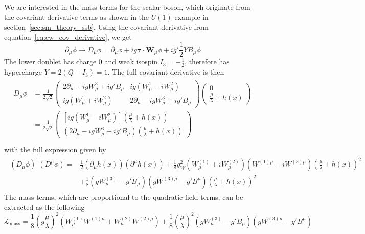 We are interested in the mass terms for the scalar boson, which originate from the covariant derivative terms as shown in the $U(1)$ example in section~\ref{sec:sm_theory_ssb}. Using the covariant derivative from equation~\ref{eq:ew_cov_derivative}, we get
\begin{equation}
	\partial_\mu\phi\to D_\mu\phi=\partial_\mu\phi+ig\boldsymbol{\tau}\cdot\mathbf{W}_\mu\phi+ig'\frac{1}{2}YB_\mu\phi
\end{equation}
The lower doublet has charge 0 and weak isospin $I_3=-\frac{1}{2}$, therefore has hypercharge $Y=2(Q-I_3)=1$. The full covariant derivative is then
\begin{align}
	\begin{split}
		D_\mu\phi&=\frac{1}{2\sqrt{2}}\begin{pmatrix}2\partial_\mu+igW_\mu^3+ig'B_\mu&ig(W_\mu^1-iW_\mu^2)\\ig(W_\mu^1+iW_\mu^2)&2\partial_\mu-igW_\mu^3+ig'B_\mu\end{pmatrix}\begin{pmatrix}0\\\frac{\mu}{\lambda}+h(x)\end{pmatrix}\\
		&=\frac{1}{2\sqrt{2}}\begin{pmatrix}\left[ig(W_\mu^1-iW_\mu^2)\right]\left(\frac{\mu}{\lambda}+h(x)\right)\\\left(2\partial_\mu-igW_\mu^3+ig'B_\mu\right)\left(\frac{\mu}{\lambda}+h(x)\right)\end{pmatrix}\\
	\end{split}
\end{align}
with the full expression given by
\begin{align}
	\begin{split}
		\left(D_\mu\phi\right)^\dagger\left(D^\mu\phi\right)=&\frac{1}{2}\left(\partial_\mu h(x)\right)\left(\partial^\mu h(x)\right)+\frac{1}{8}g_W^2\left(W_\mu^{(1)}+iW_\mu^{(2)}\right)\left(W^{(1)\mu}-iW^{(2)\mu}\right)\left(\frac{\mu}{\lambda}+h(x)\right)^2\\
		&+\frac{1}{8}\left(gW_\mu^{(3)}-g'B_\mu\right)\left(gW^{(3)\mu}-g'B^\mu\right)\left(\frac{\mu}{\lambda}+h(x)\right)^2
	\end{split}
\end{align}
The mass terms, which are proportional to the quadratic field terms, can be extracted as the following
\begin{equation}
	\mathcal{L}_\text{mass}=\frac{1}{8}(g\frac{\mu}{\lambda})^2\left(W_\mu^{(1)}W^{(1)\mu}+W_\mu^{(2)}W^{(2)\mu}\right)+\frac{1}{8}\left(\frac{\mu}{\lambda}\right)^2\left(gW_\mu^{(3)}-g'B_\mu\right)\left(gW^{(3)\mu}-g'B^\mu\right)
\end{equation}

